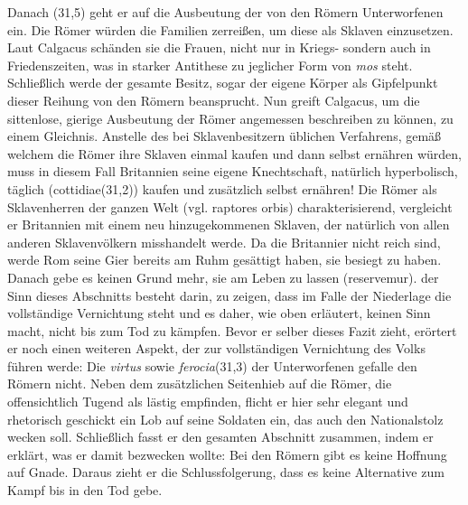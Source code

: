 \documentclass[12pt]{article}
\begin{document}
	Danach (31,5) geht er auf die Ausbeutung der von den Römern Unterworfenen ein. Die Römer würden die Familien zerreißen, um diese als Sklaven einzusetzen. Laut Calgacus schänden sie die Frauen, nicht nur in Kriegs- sondern auch in Friedenszeiten, was in starker Antithese zu jeglicher Form von \textit{mos} steht. Schließlich werde der gesamte Besitz, sogar der eigene Körper als Gipfelpunkt dieser Reihung von den Römern beansprucht. Nun greift Calgacus, um die sittenlose, gierige Ausbeutung der Römer angemessen beschreiben zu können, zu einem Gleichnis. Anstelle des bei Sklavenbesitzern üblichen Verfahrens, gemäß welchem die Römer ihre Sklaven einmal kaufen und dann selbst ernähren würden, muss in diesem Fall Britannien seine eigene Knechtschaft, natürlich hyperbolisch, täglich (\glqq cottidiae\grqq(31,2)) kaufen und zusätzlich selbst ernähren! Die Römer als Sklavenherren der ganzen Welt (vgl. \glqq raptores orbis\grqq) charakterisierend, vergleicht er Britannien mit einem neu hinzugekommenen Sklaven, der natürlich von allen anderen Sklavenvölkern misshandelt werde. Da die Britannier nicht reich sind, werde Rom seine Gier bereits am Ruhm gesättigt haben, sie besiegt zu haben. Danach gebe es keinen Grund mehr, sie am Leben zu lassen (\glqq reservemur\grqq).
	der Sinn dieses Abschnitts besteht darin, zu zeigen, dass im Falle der Niederlage die vollständige Vernichtung steht und es daher, wie oben erläutert, keinen Sinn macht, nicht bis zum Tod zu kämpfen. Bevor er selber dieses Fazit zieht, erörtert er noch einen weiteren Aspekt, der zur vollständigen Vernichtung des Volks führen werde: Die \textit{virtus} sowie \textit{ferocia}(31,3) der Unterworfenen gefalle den Römern nicht. Neben dem zusätzlichen Seitenhieb auf die Römer, die offensichtlich Tugend als lästig empfinden, flicht er hier sehr elegant und rhetorisch geschickt ein Lob auf seine Soldaten ein, das auch den Nationalstolz wecken soll.
	Schließlich fasst er den gesamten Abschnitt zusammen, indem er erklärt, was er damit bezwecken wollte: Bei den Römern gibt es keine Hoffnung auf Gnade. Daraus zieht er die Schlussfolgerung, dass es keine Alternative zum Kampf bis in den Tod gebe.
	
\end{document}
